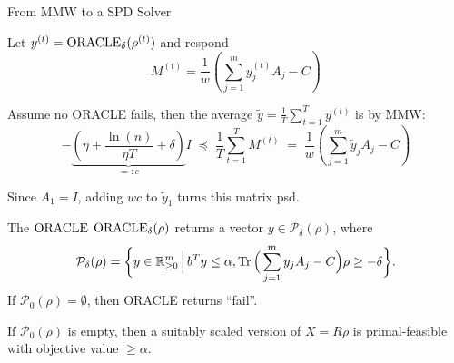 \begin{frame}{From MMW to a SPD Solver}

 Let $y^{(t)}=\operatorname{ORACLE}_\delta(\rho^{(t)})$ and respond 
\begin{equation*}
 M^{(t)}= \frac{1}{w} \left( \sum_{j=1}^m y^{(t)}_j A_j - C \right)
\end{equation*}


\vspace{\floatsep}

Assume no ORACLE fails, then the average $\tilde{y}=\frac 1 T \sum_{t=1}^T y^{(t)} $ is  by MMW:
\begin{equation*}
 - \underbrace{\left( \eta + \frac{\ln(n)}{\eta T} + \delta \right)}_{=: c} I \; \preceq \; \frac{1}{T} \sum_{t=1}^T M^{(t)} \; = \; \frac 1 w \left(\sum_{j=1}^m \tilde{y}_j A_j - C \right)
\end{equation*}

\vspace{\floatsep}

Since $A_1=I$, adding $wc$ to $\tilde{y}_1$ turns this matrix psd.

\end{frame}

\begin{frame}{The $\operatorname{ORACLE}$}
  $\operatorname{ORACLE}_\delta(\rho)$ returns a vector $y\in\mathcal{P}_\delta(\rho)$, where
 \begin{equation*}
  \mathcal{P}_\delta(\rho) = \bigg\{ y\in\mathbb{R}^m_{\geq 0} \, \Big| \, b^T y \leq \alpha, \operatorname{Tr}\Big(\sum_{j=1}^m y_j A_j - C \Big)\rho  \geq -\delta \bigg\}.
 \end{equation*}
 If $\mathcal{P}_0(\rho)=\emptyset$, then ORACLE returns ``fail''.
 
 \vspace{2\floatsep}
 
 \begin{lemma}
  If $\mathcal{P}_0(\rho)$ is empty, then a suitably scaled version of $X=R\rho$ is primal-feasible with objective value $\geq \alpha$.
 \end{lemma}

 \vspace{\floatsep}
 
 

\end{frame}

